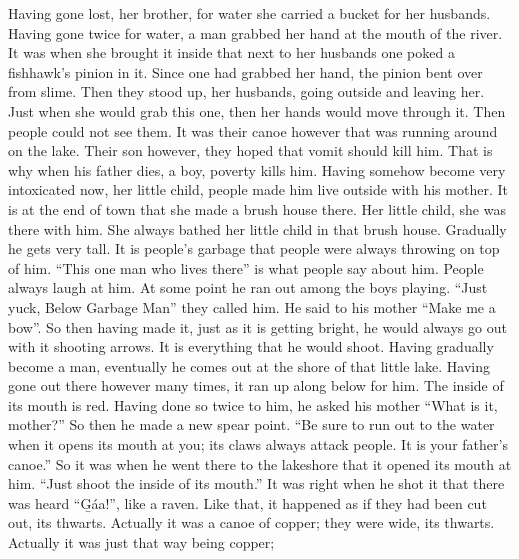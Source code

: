 \begin{pairs}
\begin{Rightside}
Having gone lost, her brother, for water she carried a bucket for her husbands.
Having gone twice for water, a man grabbed her hand at the mouth of the river.
It was when she brought it inside that next to her husbands one poked a fishhawk’s pinion in it.
Since one had grabbed her hand, the pinion bent over from slime.
Then they stood up, her husbands, going outside and leaving her.
Just when she would grab this one, then her hands would move through it.
Then people could not see them.
It was their canoe however that was running around on the lake.
\pend
\pstart
{}Their son however, they hoped that vomit should kill him.
That is why when his father dies, a boy, poverty kills him.
Having somehow become very intoxicated now, her little child, people made him live outside with his mother.
It is at the end of town that she made a brush house there.
Her little child, she was there with him.
She always bathed her little child in that brush house.
Gradually he gets very tall.
It is people’s garbage that people were always throwing on top of him.
\qqk{}“This one man who lives there” is what people say about him.
People always laugh at him.
At some point he ran out among the boys playing.
\qqk{}“Just yuck, Below Garbage Man” they called him.
He said to his mother “Make me a bow”.
So then having made it, just as it is getting bright, he would always go out with it shooting arrows.
It is everything that he would shoot.
Having gradually become a man, eventually he comes out at the shore of that little lake.
\pend
\pstart
{}Having gone out there however many times, it ran up along below for him.
The inside of its mouth is red.
Having done so twice to him, he asked his mother
\qqk{}“What is it, mother?”
So then he made a new spear point.
\qqk{}“Be sure to run out to the water when it opens its mouth at you;
its claws always attack people.
It is your father’s canoe.”
So it was when he went there to the lakeshore that it opened its mouth at him.
“Just shoot the inside of its mouth.”
It was right when he shot it that there was heard “G̱áa!”, like a raven.
Like that, it happened as if they had been cut out, its thwarts.
Actually it was a canoe of copper;
they were wide, its thwarts.
Actually it was just that way being copper;

\end{Rightside}
\end{pairs}
